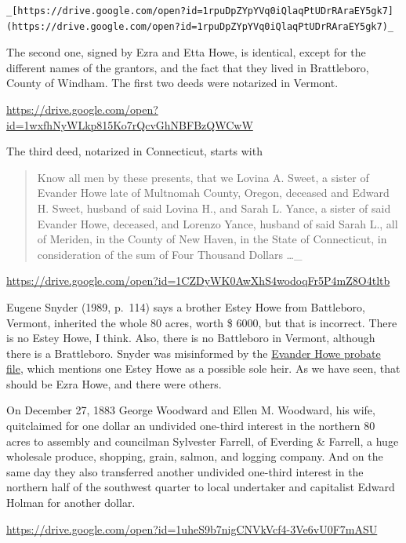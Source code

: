 \documentclass[
  12pt,
]{book}
\begin{document}
\begin{verbatim}
_[https://drive.google.com/open?id=1rpuDpZYpYVq0iQlaqPtUDrRAraEY5gk7](https://drive.google.com/open?id=1rpuDpZYpYVq0iQlaqPtUDrRAraEY5gk7)_
\end{verbatim}

The second one, signed by Ezra and Etta Howe, is identical, except for the different names of the grantors, and the fact that they lived in Brattleboro, County of Windham. The first two deeds were notarized in Vermont.

\url{https://drive.google.com/open?id=1wxfhNyWLkp815Ko7rQcvGhNBFBzQWCwW}

The third deed, notarized in Connecticut, starts with

\begin{quote}
Know all men by these presents, that we Lovina A. Sweet, a sister of Evander Howe late of Multnomah County, Oregon, deceased and Edward H. Sweet, husband of said Lovina H., and Sarah L. Yance, a sister of said Evander Howe, deceased, and Lorenzo Yance, husband of said Sarah L., all of Meriden, in the County of New Haven, in the State of Connecticut, in consideration of the sum of Four Thousand Dollars \ldots\_
\end{quote}

\url{https://drive.google.com/open?id=1CZDyWK0AwXhS4wodoqFr5P4mZ8O4tltb}

Eugene Snyder (1989, p.~114) says a brother Estey Howe from Battleboro, Vermont, inherited the whole 80 acres, worth \$ 6000, but that is incorrect. There is no Estey Howe, I think. Also, there is no Battleboro in Vermont, although there is a Brattleboro. Snyder was misinformed by the \href{https://drive.google.com/open?id=1xs6X_Qrkn7oQ42qUxIBs0PgluGlfWPlM}{Evander Howe probate file}, which mentions one Estey Howe as a possible sole heir. As we have seen, that should be Ezra Howe, and there were others.

On December 27, 1883 George Woodward and Ellen M. Woodward, his wife, quitclaimed for one dollar an undivided one-third interest in the northern 80 acres to assembly and councilman Sylvester Farrell, of Everding \& Farrell, a huge wholesale produce, shopping, grain, salmon, and logging company. And on the same day they also transferred another undivided one-third interest in the northern half of the southwest quarter to local undertaker and capitalist Edward Holman for another dollar.

\url{https://drive.google.com/open?id=1uheS9b7nigCNVkVcf4-3Ve6vU0F7mASU}
\end{document}
